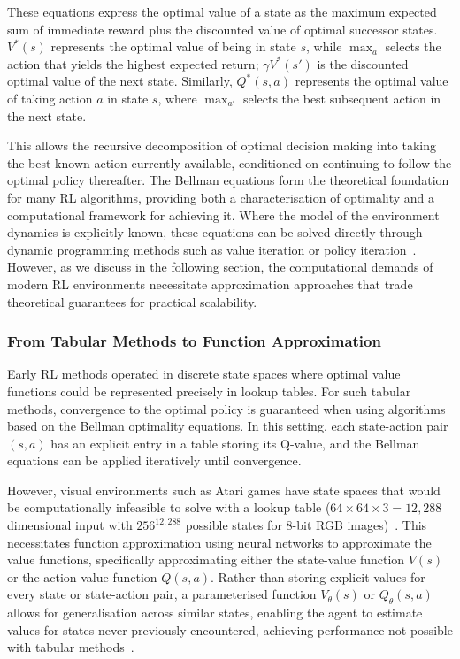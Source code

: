 These equations express the optimal value of a state as the maximum expected sum of immediate reward plus the discounted value of optimal successor states. $V^*(s)$ represents the optimal value of being in state $s$, while $\max_a$ selects the action that yields the highest expected return; $\gamma V^*(s')$ is the discounted optimal value of the next state. Similarly, $Q^*(s,a)$ represents the optimal value of taking action $a$ in state $s$, where $\max_{a'}$ selects the best subsequent action in the next state.

This allows the recursive decomposition of optimal decision making into taking the best known action currently available, conditioned on continuing to follow the optimal policy thereafter. The Bellman equations form the theoretical foundation for many RL algorithms, providing both a characterisation of optimality and a computational framework for achieving it. Where the model of the environment dynamics is explicitly known, these equations can be solved directly through dynamic programming methods such as value iteration or policy iteration~\citep{sutton2018reinforcement}. However, as we discuss in the following section, the computational demands of modern RL environments necessitate approximation approaches that trade theoretical guarantees for practical scalability.

\subsubsection{From Tabular Methods to Function Approximation}\label{subsubsec:tabular_to_function_approx}

Early RL methods operated in discrete state spaces where optimal value functions could be represented precisely in lookup tables. For such tabular methods, convergence to the optimal policy is guaranteed when using algorithms based on the Bellman optimality equations. In this setting, each state-action pair $(s,a)$ has an explicit entry in a table storing its Q-value, and the Bellman equations can be applied iteratively until convergence.

However, visual environments such as Atari games have state spaces that would be computationally infeasible to solve with a lookup table ($64\times64\times3 = 12,288$ dimensional input with $256^{12,288}$ possible states for 8-bit RGB images)~\citep{mnih_2013_playing}. This necessitates function approximation using neural networks to approximate the value functions, specifically approximating either the state-value function $V(s)$ or the action-value function $Q(s,a)$. Rather than storing explicit values for every state or state-action pair, a parameterised function $V_\theta(s)$ or $Q_\theta(s,a)$ allows for generalisation across similar states, enabling the agent to estimate values for states never previously encountered, achieving performance not possible with tabular methods~\cite{mnih_2015_humanlevel}.

